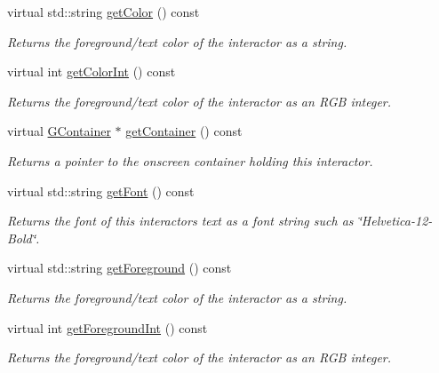 \begin{DoxyCompactItemize}
virtual std\+::string \mbox{\hyperlink{classsgl_1_1GInteractor_aa061dfa488c31e18549d64363c1d0e34}{get\+Color}} () const
\begin{DoxyCompactList}\small\item\em Returns the foreground/text color of the interactor as a string. \end{DoxyCompactList}\item 
virtual int \mbox{\hyperlink{classsgl_1_1GInteractor_a9635c7af766cdc3417f346683fa0e6c1}{get\+Color\+Int}} () const
\begin{DoxyCompactList}\small\item\em Returns the foreground/text color of the interactor as an R\+GB integer. \end{DoxyCompactList}\item 
virtual \mbox{\hyperlink{classsgl_1_1GContainer}{G\+Container}} $\ast$ \mbox{\hyperlink{classsgl_1_1GInteractor_a7a6e317c29d61030929b4cd2d1c00fe7}{get\+Container}} () const
\begin{DoxyCompactList}\small\item\em Returns a pointer to the onscreen container holding this interactor. \end{DoxyCompactList}\item 
virtual std\+::string \mbox{\hyperlink{classsgl_1_1GInteractor_a894a5502900794eeb27d084c21f1d77d}{get\+Font}} () const
\begin{DoxyCompactList}\small\item\em Returns the font of this interactor\textquotesingle{}s text as a font string such as \char`\"{}\+Helvetica-\/12-\/\+Bold\char`\"{}. \end{DoxyCompactList}\item 
virtual std\+::string \mbox{\hyperlink{classsgl_1_1GInteractor_a4fa2d8b0192a3a5b4af4bbfe71194d03}{get\+Foreground}} () const
\begin{DoxyCompactList}\small\item\em Returns the foreground/text color of the interactor as a string. \end{DoxyCompactList}\item 
virtual int \mbox{\hyperlink{classsgl_1_1GInteractor_ac3b12ab385a6ef9ae90fc879860ba726}{get\+Foreground\+Int}} () const
\begin{DoxyCompactList}\small\item\em Returns the foreground/text color of the interactor as an R\+GB integer. \end{DoxyCompactList}\item 

\end{DoxyCompactItemize}
